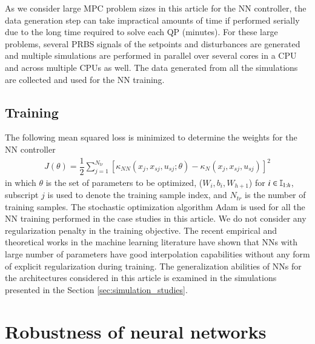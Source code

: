 \documentclass[preprint,5p, twocolumn, authoryear]{elsarticle}
\begin{document}
As we consider large
MPC problem sizes in this article for the NN 
controller, the data generation step
can take impractical amounts of time if performed
serially due to the long time required to solve 
each QP (minutes). For these large problems, 
several PRBS signals of the setpoints 
and disturbances are generated and 
multiple simulations are performed in parallel over 
several cores in a CPU and across multiple CPUs as well.
The data generated from all the simulations are collected
and used for the NN training.

\subsection{Training}
The following mean squared loss is minimized 
to determine the weights for the NN controller
\begin{align}
    J (\theta) = \dfrac{1}{2}\sum_{j=1}^{N_{tr}} 
[\kappa_{NN}(x_j, x_{sj}, u_{sj}; \theta) - \kappa_N(x_j, x_{sj}, u_{sj})]^2 
\end{align}
in which $\theta$ is the set of parameters 
to be optimized, ($W_i, b_i, W_{h+1}$)
for $i \in \mathbb{I}_{1:h}$, subscript $j$ is used 
to denote the training sample index, and 
$N_{tr}$ is the number of training 
samples. The stochastic optimization algorithm Adam 
\citep*{kingma:ba:2014} is used for all the NN training
performed in the case studies in this article. We do not 
consider any regularization penalty in the training objective. 
The recent empirical and theoretical works in the machine learning 
literature have shown that NNs with large number of parameters 
have good interpolation capabilities 
\citep*{belkin:hsu:ma:mandal:2019, zhang:bengio:hardt:recht:vinyals:2017, 
arora:simon:hu:li:wang:2019, allen-zhu:li:liang:2019} 
without any form of explicit regularization during training.
The generalization abilities of 
NNs for the architectures considered in this article
is examined in the 
simulations presented in the Section \ref{sec:simulation_studies}.

\section{Robustness of neural networks} \label{sec:robustness}
\end{document}
